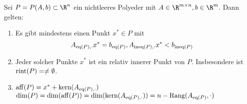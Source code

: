 \begin{satz}
Sei $P = P(A,b) \subset  \R^n$ ein nichtleeres Polyeder mit $A\in \R^{m \times n}, b\in \R^m$. Dann gelten:
\begin{enumerate}[label = (\alph*)]
	\item Es gibt mindestens einen Punkt $x^* \in P$ mit 
		\begin{equation*}
			A_{\operatorname{eq}(P),\cdot}x^* = b_{\operatorname{eq}(P)}, A_{\text{ineq}(P),\cdot}x^* < b_{\text{ineq}(P)}
		\end{equation*}
	\item Jeder solcher Punkte $x^*$ ist ein relativ innerer Punkt von $P$. Insbesondere ist $\operatorname{rint}(P)=\neq \emptyset$. 
	\item $\operatorname{aff}(P) = x^* + \text{kern}(A_{\operatorname{eq}(P),\cdot})$ \\
		$\dim(P) = \dim(\operatorname{aff}(P)) = \dim (\text{kern}(A_{\operatorname{eq}(P),\cdot}))=n - \text{Rang}(A_{\operatorname{eq}(P)},\cdot)$
\end{enumerate}
\end{satz}
